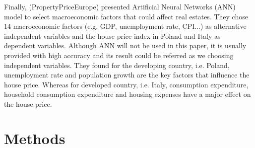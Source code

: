 \documentclass[11pt]{article}
\begin{document}
Finally, (PropertyPriceEurope) presented Artificial Neural Networks (ANN) model to select macroeconomic factors that could affect real estates. They chose 14 macroeconomic factors (e.g. GDP, unemployment rate, CPI...) as alternative independent variables and the house price index in Poland and Italy as dependent variables. Although ANN will not be used in this paper, it is usually provided with high accuracy and its result could be referred as we choosing independent variables. They found for the developing country, i.e. Poland, unemployment rate and population growth are the key factors that influence the house price. Whereas for developed country, i.e. Italy, consumption expenditure, household consumption expenditure and housing expenses have a major effect on the house price.

\section{Methods}\label{methods}


\end{document}
